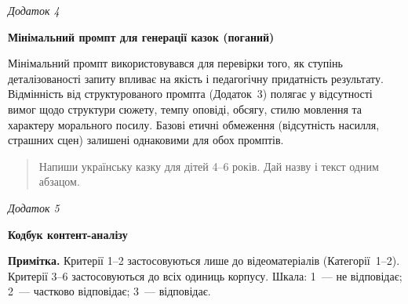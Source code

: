 \documentclass[14pt, a4paper]{extreport}
\begin{document}
\newpage
\begin{flushright}\textit{Додаток 4}\end{flushright}
\begin{center}\textbf{Мінімальний промпт для генерації казок (поганий)}\end{center}
\vspace{0.3cm}

Мінімальний промпт використовувався для перевірки того, як ступінь деталізованості запиту впливає на якість і педагогічну придатність результату. Відмінність від структурованого промпта (Додаток~3) полягає у відсутності вимог щодо структури сюжету, темпу оповіді, обсягу, стилю мовлення та характеру морального посилу. Базові етичні обмеження (відсутність насилля, страшних сцен) залишені однаковими для обох промптів.

\begin{quote}
Напиши українську казку для дітей 4--6 років. Дай назву і текст одним абзацом.
\end{quote}

\newpage
\begin{flushright}\textit{Додаток 5}\end{flushright}
\begin{center}\textbf{Кодбук контент-аналізу}\end{center}
\vspace{0.3cm}

{\small
\textbf{Примітка.} Критерії 1--2 застосовуються лише до відеоматеріалів (Категорії~1--2). Критерії 3--6 застосовуються до всіх одиниць корпусу. Шкала: 1~--- не відповідає; 2~--- частково відповідає; 3~--- відповідає.
}
\vspace{6pt}
\end{document}
